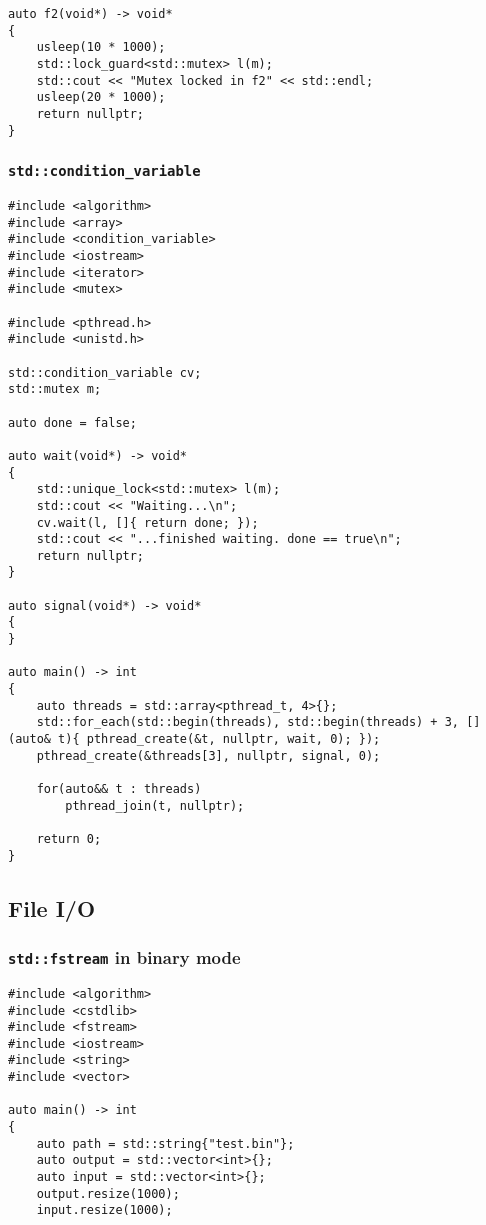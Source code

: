 \begin{appendix}
\begin{lstlisting}
auto f2(void*) -> void*
{
    usleep(10 * 1000);
    std::lock_guard<std::mutex> l(m);
    std::cout << "Mutex locked in f2" << std::endl;
    usleep(20 * 1000);
    return nullptr;
}
\end{lstlisting}

\subsubsection{\texttt{std::condition\_variable}}\label{app:scorep_sync_cv}

\begin{lstlisting}
#include <algorithm>
#include <array>
#include <condition_variable>
#include <iostream>
#include <iterator>
#include <mutex>

#include <pthread.h>
#include <unistd.h>

std::condition_variable cv;
std::mutex m;

auto done = false;

auto wait(void*) -> void*
{
    std::unique_lock<std::mutex> l(m);
    std::cout << "Waiting...\n";
    cv.wait(l, []{ return done; });
    std::cout << "...finished waiting. done == true\n";
    return nullptr;
}

auto signal(void*) -> void*
{
}

auto main() -> int
{
    auto threads = std::array<pthread_t, 4>{};
    std::for_each(std::begin(threads), std::begin(threads) + 3, [](auto& t){ pthread_create(&t, nullptr, wait, 0); });
    pthread_create(&threads[3], nullptr, signal, 0);
    
    for(auto&& t : threads)
        pthread_join(t, nullptr);
        
    return 0;
}
\end{lstlisting}

\subsection{File I/O}

\subsubsection{\texttt{std::fstream} in binary mode}\label{app:scorep_binary_fstream}

\begin{lstlisting}
#include <algorithm>
#include <cstdlib>
#include <fstream>
#include <iostream>
#include <string>
#include <vector>

auto main() -> int
{
    auto path = std::string{"test.bin"};
    auto output = std::vector<int>{};
    auto input = std::vector<int>{};
    output.resize(1000);
    input.resize(1000);
    

\end{lstlisting}
\end{appendix}
